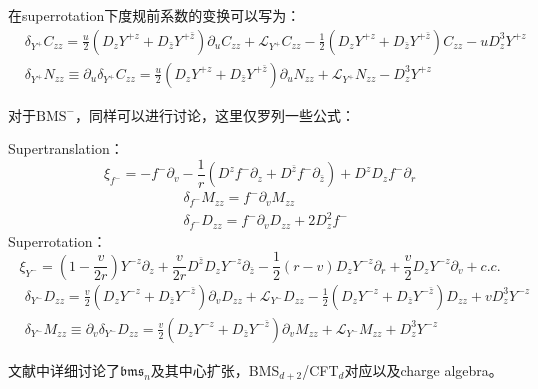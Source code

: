 在superrotation下度规前系数的变换可以写为：
\begin{equation}
	\begin{aligned}
		&\delta_{Y^+}C_{zz}=\frac{u}{2}\left(D_zY^{+z}+D_{\bar z}Y^{+\bar z} \right)\partial_u C_{zz}+\mathcal{L}_{Y^+}C_{zz}-\frac{1}{2}\left(D_zY^{+z}+D_{\bar z}Y^{+\bar z}\right)C_{zz}-uD^3_{z}Y^{+z}\\
		&\delta_{Y^+}N_{zz}\equiv\partial_u\delta_{Y^+}C_{zz}=\frac{u}{2}\left(D_zY^{+z}+D_{\bar z}Y^{+\bar z} \right)\partial_u N_{zz}+\mathcal{L}_{Y^+}N_{zz}-D^3_zY^{+z}
	\end{aligned}
\end{equation}

对于$\text{BMS}^-$，同样可以进行讨论，这里仅罗列一些公式：

\noindent Supertranslation：
\begin{equation}
	\xi_{f^-}=-f^-\partial_v-\frac{1}{r}\left(D^zf^-\partial_z+D^{\bar z}f^-\partial_{\bar z}\right)+D^zD_zf^-\partial_r
\end{equation}
\begin{equation}
	\begin{aligned}
		&\delta_{f^-}M_{zz}=f^-\partial_v M_{zz}\\
		&\delta_{f^-}D_{zz}=f^-\partial_v D_{zz}+2D_z^2f^-
	\end{aligned}
\end{equation}
Superrotation：
\begin{equation}
	\xi_{Y^-}=\left(1-\frac{v}{2r}\right)Y^{-z}\partial_z+\frac{v}{2r}D^{\bar z}D_zY^{-z}\partial_{\bar z}-\frac{1}{2}(r-v)D_zY^{-z}\partial_r+\frac{v}{2}D_zY^{-z}\partial_v+c.c.
\end{equation}
\begin{equation}
	\begin{aligned}
		&\delta_{Y^-}D_{zz}=\frac{v}{2}\left(D_zY^{-z}+D_{\bar z}Y^{-\bar z} \right)\partial_v D_{zz}+\mathcal{L}_{Y^-}D_{zz}-\frac{1}{2}\left(D_zY^{-z}+D_{\bar z}Y^{-\bar z}\right)D_{zz}+vD^3_{z}Y^{-z}\\
		&\delta_{Y^-}M_{zz}\equiv\partial_v\delta_{Y^-}D_{zz}=\frac{v}{2}\left(D_zY^{-z}+D_{\bar z}Y^{-\bar z} \right)\partial_v M_{zz}+\mathcal{L}_{Y^-}M_{zz}+D^3_zY^{-z}
	\end{aligned}
\end{equation}

文献\cite{Barnich:2010ojg,Barnich:2010eb}中详细讨论了$\mathfrak{bms}_n$及其中心扩张，BMS$_{d+2}$/CFT$_d$对应以及charge algebra。

